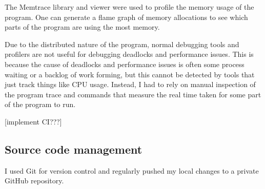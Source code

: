 The Memtrace library and viewer were used to profile the memory usage of the program. One can generate a flame graph of memory allocations to see which parts of the program are using the most memory.


Due to the distributed nature of the program, normal debugging tools and profilers are not useful for debugging deadlocks and performance issues. This is because the cause of deadlocks and performance issues is often some process waiting or a backlog of work forming, but this cannot be detected by tools that just track things like CPU usage. Instead, I had to rely on manual inspection of the program trace and commands that measure the real time taken for some part of the program to run.

[implement CI???]
\subsection{Source code management}
I used Git for version control and regularly pushed my local changes to a private GitHub repository.